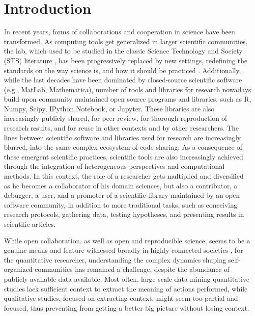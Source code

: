\section{Introduction}
In recent years, forms of collaborations and cooperation in science have been transformed. As computing tools get generalized in larger scientific communities, the lab, which used to be studied in the classic Science Technology and Society (STS) literature \cite{latour1987science,houdart2008cour}, has been progressively replaced by new settings, redefining the standards \cite{galison1996disunity,kitchin2014big} on the way science is, and how it should be practiced \cite{calvert2013collaboration,leonelli2012introduction}. Additionally, while the last decades have been dominated by closed-source scientific software (e.g., MatLab, Mathematica), number of tools and libraries for research nowadays build upon community maintained open source programs and libraries, such as R, Numpy, Scipy, IPython Notebook, or Jupyter. These libraries are also increasingly publicly shared, for peer-review, for thorough reproduction of research results, and for reuse in other contexts and by other researchers. The lines between scientific software and libraries used for research are increasingly blurred, into the same complex ecosystem of code sharing. As a consequence of these emergent scientific practices, scientific tools are also increasingly achieved through the integration of heterogeneous perspectives and computational methods. In this context, the role of a researcher gets multiplied and diversified as he becomes a collaborator of his domain sciences, but also a contributor, a debugger, a user, and a promoter of a scientific library maintained by an open software community, in addition to more traditional tasks, such as conceiving research protocols, gathering data, testing hypotheses, and presenting results in scientific articles.

While open collaboration, as well as open and reproducible science, seems to be a genuine means and feature witnessed broadly in highly connected societies \cite{benkler2011penguin}, for the quantitative researcher, understanding the complex dynamics shaping self-organized communities has remained a challenge, despite the abundance of publicly available data available. Most often, large scale data mining quantitative studies lack sufficient context to extract the meaning of actions performed, while qualitative studies, focused on extracting context, might seem too partial and focused, thus preventing from getting a better big picture without losing context. 

